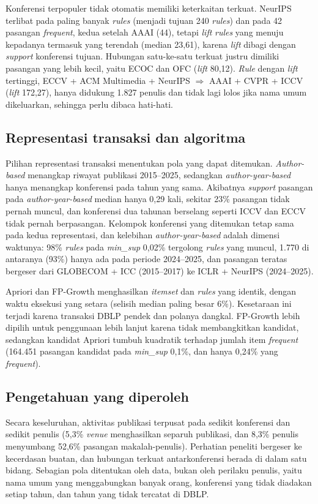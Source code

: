 Konferensi terpopuler tidak otomatis memiliki keterkaitan terkuat. NeurIPS terlibat pada paling banyak \textit{rules} (menjadi tujuan 240 \textit{rules}) dan pada 42 pasangan \textit{frequent}, kedua setelah AAAI (44), tetapi \textit{lift} \textit{rules} yang menuju kepadanya termasuk yang terendah (median 23,61), karena \textit{lift} dibagi dengan \textit{support} konferensi tujuan. Hubungan satu-ke-satu terkuat justru dimiliki pasangan yang lebih kecil, yaitu ECOC dan OFC (\textit{lift} 80,12). \textit{Rule} dengan \textit{lift} tertinggi, ECCV + ACM Multimedia + NeurIPS $\Rightarrow$ AAAI + CVPR + ICCV (\textit{lift} 172,27), hanya didukung 1.827 penulis dan tidak lagi lolos jika nama umum dikeluarkan, sehingga perlu dibaca hati-hati.

\subsection{Representasi transaksi dan algoritma}
Pilihan representasi transaksi menentukan pola yang dapat ditemukan. \textit{Author-based} menangkap riwayat publikasi 2015--2025, sedangkan \textit{author-year-based} hanya menangkap konferensi pada tahun yang sama. Akibatnya \textit{support} pasangan pada \textit{author-year-based} median hanya 0,29 kali, sekitar 23\% pasangan tidak pernah muncul, dan konferensi dua tahunan berselang seperti ICCV dan ECCV tidak pernah berpasangan. Kelompok konferensi yang ditemukan tetap sama pada kedua representasi, dan kelebihan \textit{author-year-based} adalah dimensi waktunya: 98\% \textit{rules} pada \textit{min\_sup} 0,02\% tergolong \textit{rules} yang muncul, 1.770 di antaranya (93\%) hanya ada pada periode 2024--2025, dan pasangan teratas bergeser dari GLOBECOM + ICC (2015--2017) ke ICLR + NeurIPS (2024--2025).

Apriori dan FP-Growth menghasilkan \textit{itemset} dan \textit{rules} yang identik, dengan waktu eksekusi yang setara (selisih median paling besar 6\%). Kesetaraan ini terjadi karena transaksi DBLP pendek dan polanya dangkal. FP-Growth lebih dipilih untuk penggunaan lebih lanjut karena tidak membangkitkan kandidat, sedangkan kandidat Apriori tumbuh kuadratik terhadap jumlah item \textit{frequent} (164.451 pasangan kandidat pada \textit{min\_sup} 0,1\%, dan hanya 0,24\% yang \textit{frequent}).

\subsection{Pengetahuan yang diperoleh}
Secara keseluruhan, aktivitas publikasi terpusat pada sedikit konferensi dan sedikit penulis (5,3\% \textit{venue} menghasilkan separuh publikasi, dan 8,3\% penulis menyumbang 52,6\% pasangan makalah-penulis). Perhatian peneliti bergeser ke kecerdasan buatan, dan hubungan terkuat antarkonferensi berada di dalam satu bidang. Sebagian pola ditentukan oleh data, bukan oleh perilaku penulis, yaitu nama umum yang menggabungkan banyak orang, konferensi yang tidak diadakan setiap tahun, dan tahun yang tidak tercatat di DBLP.

